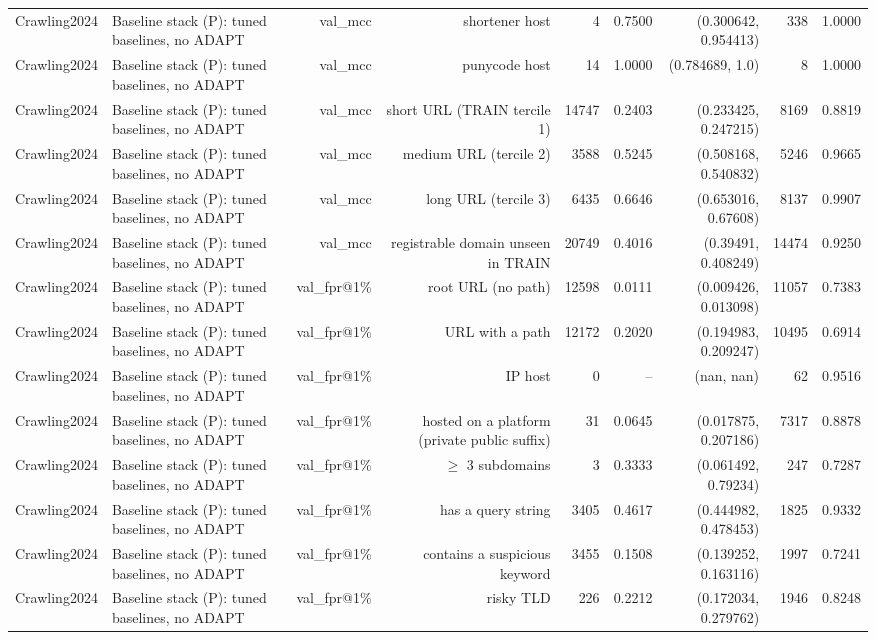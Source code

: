 \begin{table}[t]
\begin{tabular}{llrrrrrrr}
Crawling2024 & Baseline stack (P): tuned baselines, no ADAPT & val\_mcc & shortener host & 4 & 0.7500 & (0.300642, 0.954413) & 338 & 1.0000 \\
Crawling2024 & Baseline stack (P): tuned baselines, no ADAPT & val\_mcc & punycode host & 14 & 1.0000 & (0.784689, 1.0) & 8 & 1.0000 \\
Crawling2024 & Baseline stack (P): tuned baselines, no ADAPT & val\_mcc & short URL (TRAIN tercile 1) & 14747 & 0.2403 & (0.233425, 0.247215) & 8169 & 0.8819 \\
Crawling2024 & Baseline stack (P): tuned baselines, no ADAPT & val\_mcc & medium URL (tercile 2) & 3588 & 0.5245 & (0.508168, 0.540832) & 5246 & 0.9665 \\
Crawling2024 & Baseline stack (P): tuned baselines, no ADAPT & val\_mcc & long URL (tercile 3) & 6435 & 0.6646 & (0.653016, 0.67608) & 8137 & 0.9907 \\
Crawling2024 & Baseline stack (P): tuned baselines, no ADAPT & val\_mcc & registrable domain unseen in TRAIN & 20749 & 0.4016 & (0.39491, 0.408249) & 14474 & 0.9250 \\
Crawling2024 & Baseline stack (P): tuned baselines, no ADAPT & val\_fpr@1\% & root URL (no path) & 12598 & 0.0111 & (0.009426, 0.013098) & 11057 & 0.7383 \\
Crawling2024 & Baseline stack (P): tuned baselines, no ADAPT & val\_fpr@1\% & URL with a path & 12172 & 0.2020 & (0.194983, 0.209247) & 10495 & 0.6914 \\
Crawling2024 & Baseline stack (P): tuned baselines, no ADAPT & val\_fpr@1\% & IP host & 0 & -- & (nan, nan) & 62 & 0.9516 \\
Crawling2024 & Baseline stack (P): tuned baselines, no ADAPT & val\_fpr@1\% & hosted on a platform (private public suffix) & 31 & 0.0645 & (0.017875, 0.207186) & 7317 & 0.8878 \\
Crawling2024 & Baseline stack (P): tuned baselines, no ADAPT & val\_fpr@1\% & $\geq$ 3 subdomains & 3 & 0.3333 & (0.061492, 0.79234) & 247 & 0.7287 \\
Crawling2024 & Baseline stack (P): tuned baselines, no ADAPT & val\_fpr@1\% & has a query string & 3405 & 0.4617 & (0.444982, 0.478453) & 1825 & 0.9332 \\
Crawling2024 & Baseline stack (P): tuned baselines, no ADAPT & val\_fpr@1\% & contains a suspicious keyword & 3455 & 0.1508 & (0.139252, 0.163116) & 1997 & 0.7241 \\
Crawling2024 & Baseline stack (P): tuned baselines, no ADAPT & val\_fpr@1\% & risky TLD & 226 & 0.2212 & (0.172034, 0.279762) & 1946 & 0.8248 \\

\end{tabular}
\end{table}
